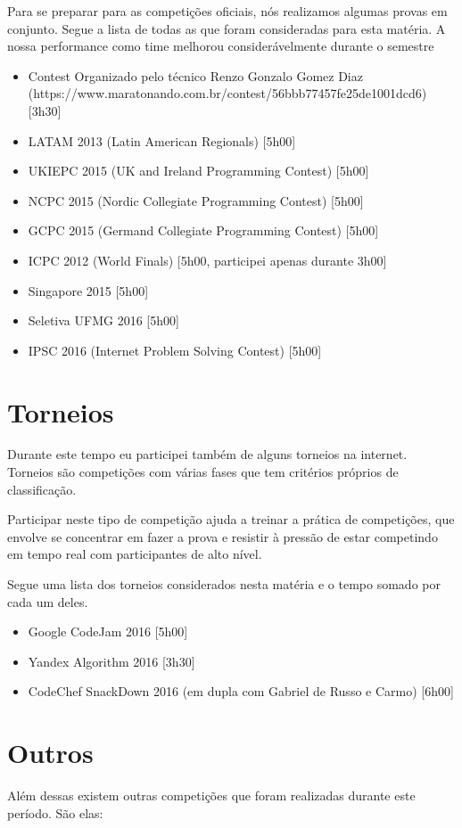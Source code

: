 \documentclass[a4paper, 11pt]{article} %
\begin{document}
Para se preparar para as competições oficiais, nós realizamos algumas provas em conjunto. Segue a lista de todas as que foram consideradas para esta matéria. A nossa performance como time melhorou considerávelmente durante o semestre

\begin{itemize}
    \item Contest Organizado pelo técnico Renzo Gonzalo Gomez Diaz (https://www.maratonando.com.br/contest/56bbb77457fe25de1001dcd6) [3h30]
    \item LATAM 2013 (Latin American Regionals) [5h00]
    \item UKIEPC 2015 (UK and Ireland Programming Contest) [5h00]
    \item NCPC 2015 (Nordic Collegiate Programming Contest) [5h00]
    \item GCPC 2015 (Germand Collegiate Programming Contest) [5h00]
    \item ICPC 2012 (World Finals) [5h00, participei apenas durante 3h00]
    \item Singapore 2015 [5h00]
    \item Seletiva UFMG 2016 [5h00]
    \item IPSC 2016 (Internet Problem Solving Contest) [5h00]
\end{itemize}

\section*{Torneios}
Durante este tempo eu participei também de alguns torneios na internet. Torneios são competições com várias fases que tem critérios próprios de classificação.

Participar neste tipo de competição ajuda a treinar a prática de competições, que envolve se concentrar em fazer a prova e resistir à pressão de estar competindo em tempo real com participantes de alto nível.

Segue uma lista dos torneios considerados nesta matéria e o tempo somado por cada um deles.

\begin{itemize}
    \item Google CodeJam 2016 [5h00]
    \item Yandex Algorithm 2016 [3h30]
    \item CodeChef SnackDown 2016 (em dupla com Gabriel de Russo e Carmo) [6h00]
\end{itemize}

\section*{Outros}
Além dessas existem outras competições que foram realizadas durante este período. São elas:
\end{document}
